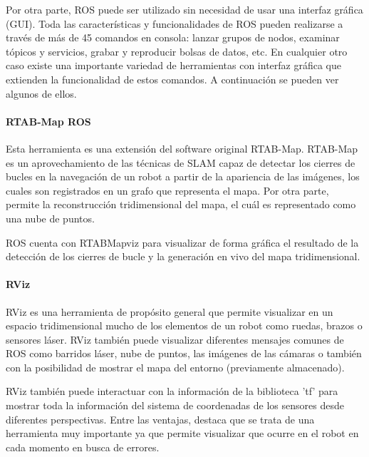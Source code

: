 Por otra parte, ROS puede ser utilizado sin necesidad de usar una interfaz
gráfica (GUI). Toda las características y funcionalidades de ROS pueden
realizarse a través de más de 45 comandos en consola: lanzar grupos de nodos,
examinar tópicos y servicios, grabar y reproducir bolsas de datos, etc. En
cualquier otro caso existe una importante variedad de herramientas con interfaz
gráfica que extienden la funcionalidad de estos comandos. A continuación se
pueden ver algunos de ellos.

\paragraph{RTAB-Map ROS} \hspace{0pt}

Esta herramienta es una extensión del software original RTAB-Map. RTAB-Map
es un aprovechamiento de las técnicas de SLAM capaz de detectar los cierres de
bucles en la navegación de un robot a partir de la apariencia de las imágenes,
los cuales son registrados en un grafo que representa el mapa. Por otra parte,
permite la reconstrucción tridimensional del mapa, el cuál es representado como
una nube de puntos. 

ROS cuenta con RTABMapviz para visualizar de forma gráfica el resultado de la
detección de los cierres de bucle y la generación en vivo del mapa
tridimensional.

\paragraph{RViz} \hspace{0pt}

RViz es una herramienta de propósito general que permite visualizar en un
espacio tridimensional mucho de los elementos de un robot como ruedas, brazos o
sensores láser. RViz también puede visualizar diferentes mensajes comunes de ROS
como barridos láser, nube de puntos, las imágenes de las cámaras o también con
la posibilidad de mostrar el mapa del entorno (previamente almacenado).

RViz también puede interactuar con la información de la biblioteca 'tf' para
mostrar toda la información del sistema de coordenadas de los sensores desde
diferentes perspectivas. Entre las ventajas, destaca que se trata de una
herramienta muy importante ya que permite visualizar que ocurre en el robot en
cada momento en busca de errores.

